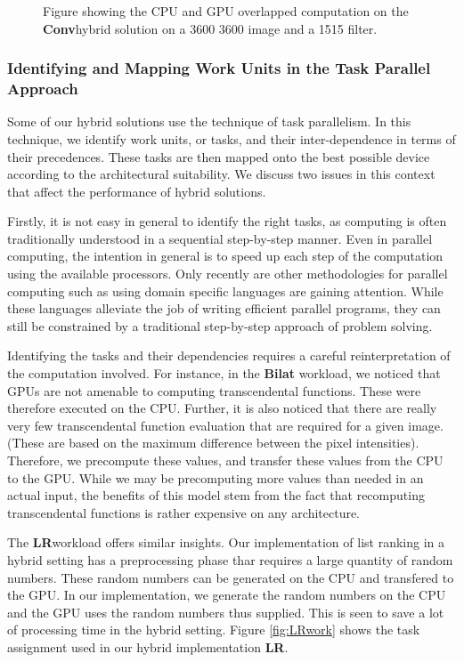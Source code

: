 \documentclass[11pt]{article}
\newcommand{\bilat} {{\bf Bilat}}
\newcommand{\conv} {{\bf Conv}}
\newcommand{\LR} {{\bf LR}}
\begin{document}
\begin{figure}
\centering
{}
\caption{Figure showing the CPU and GPU overlapped computation on the \conv hybrid
solution on a 3600 3600 image and a 1515 filter.}
\label{fig:conv}
\end{figure}


\subsubsection{Identifying and Mapping Work Units in the Task Parallel
Approach}
Some of our hybrid solutions use the technique of task parallelism. In this
technique, we identify work units, or tasks, and their inter-dependence in terms
of their precedences. These tasks are then mapped onto the best possible
device according to the architectural suitability. We discuss two issues
in this context that affect the performance of hybrid solutions.

Firstly, it is not easy in general to identify the right tasks, as computing is
often traditionally understood in a sequential step-by-step manner. Even in
parallel computing, the intention in general is to speed up each step of the
computation using the available processors. Only recently are other
methodologies for parallel computing such as using domain specific languages
\cite{dsl1,dsl2} are gaining attention. While these languages
alleviate the job of writing efficient parallel programs, they can still be
constrained by a traditional step-by-step approach of problem solving.


Identifying the tasks and their dependencies requires a careful
reinterpretation of the computation involved. For instance, in the \bilat
workload, we noticed that GPUs are not amenable to computing transcendental
functions. These were therefore executed on the CPU. Further, it is also
noticed that there are really very few transcendental function evaluation
that are required for a given image. (These are based on the maximum
difference between the pixel intensities). Therefore, we precompute these
values, and transfer these values from the CPU to the GPU. While we may be
precomputing more values than needed in an actual input, the benefits of
this model stem from the fact that recomputing transcendental functions is
rather expensive on any architecture. 

The \LR workload offers similar insights. Our implementation of
list ranking in a hybrid setting \cite{hipc11} has a preprocessing phase
thar requires a large quantity of random numbers.  These random numbers can be
generated on the CPU and transfered to the GPU. In our implementation, we
generate the random numbers on the CPU and the GPU uses the 
random numbers thus supplied. This is seen to save a lot of processing time
in the hybrid setting. Figure \ref{fig:LRwork} shows the
task assignment used in our hybrid implementation \LR.
\end{document}
